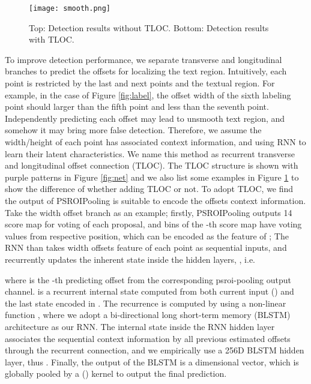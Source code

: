 \documentclass[10pt,twocolumn,letterpaper]{article}
\begin{document}
\begin{figure}[htb]
  \centering
  \centerline{\texttt{[image: smooth.png]}} \caption{Top: Detection results without TLOC. Bottom: Detection results with TLOC.}\label{fig:smooth}
\end{figure}

To improve detection performance, we separate transverse and longitudinal branches to predict the offsets for localizing the text region. Intuitively, each point is restricted by the last and next points and the textual region. For example, in the case of Figure \ref{fig:label}, the offset width of the sixth labeling point should larger than the fifth point and less than the seventh point. Independently predicting each offset may lead to unsmooth text region, and somehow it may bring more false detection. Therefore, we assume the width/height of each point has associated context information, and using RNN to learn their latent characteristics. We name this method as recurrent transverse and longitudinal offset connection (TLOC). The TLOC structure is shown with purple patterns in Figure \ref{fig:net} and we also list some examples in Figure \ref{fig:smooth} to show the difference of whether adding TLOC or not.
To adopt TLOC, we find the output of PSROIPooling is suitable to encode the offsets context information. Take the width offset branch as an example; firstly, PSROIPooling outputs 14  score map for voting  of each proposal, and  bins of the -th score map have  voting values from respective position, which can be encoded as the feature of ; The RNN than takes width offsets feature of each point as sequential inputs, and recurrently updates the inherent state inside the hidden layers, , i.e.

where  is the -th predicting offset from the corresponding psroi-pooling output channel.  is a recurrent internal state computed from both current input () and the last state encoded in . The recurrence is computed by using a non-linear function , where we adopt a bi-directional long short-term memory (BLSTM) architecture \cite{hochreiter1997long} as our RNN. The internal state inside the RNN hidden layer associates the sequential context information by all previous estimated offsets through the recurrent connection, and we empirically use a 256D BLSTM hidden layer, thus . Finally, the output of the BLSTM is a  dimensional  vector, which is globally pooled by a () kernel to output the final prediction.
\end{document}
